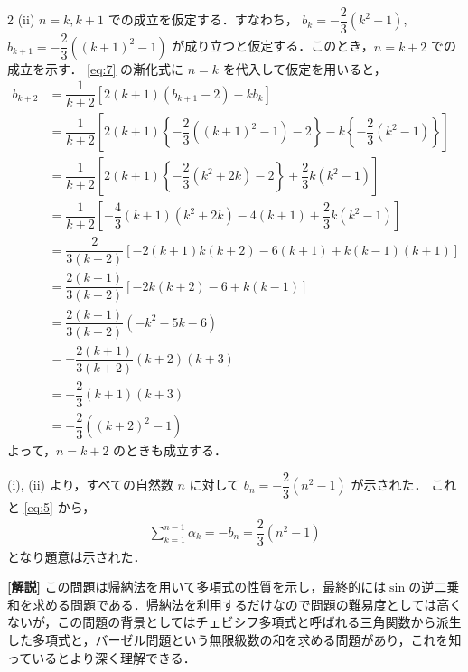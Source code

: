 \documentclass[../../main.tex]{subfiles}
\begin{document}
\begin{multicols}{2}
  (ii) $n=k, k+1$ での成立を仮定する．すなわち，
  $b_k = -\dfrac{2}{3}(k^2 - 1)$, $b_{k+1} = -\dfrac{2}{3}((k+1)^2 - 1)$
  が成り立つと仮定する．このとき，$n=k+2$ での成立を示す．
  \cref{eq:7} の漸化式に $n=k$ を代入して仮定を用いると，
  \begin{align}
    b_{k+2}
    & = \dfrac{1}{k+2} \left[ 2(k+1)(b_{k+1} - 2) - k b_k \right]                                                                      \\
    & = \dfrac{1}{k+2} \left[ 2(k+1) \left\{ -\dfrac{2}{3}((k+1)^2 - 1) - 2 \right\} - k \left\{ -\dfrac{2}{3}(k^2 - 1) \right\} \right] \\
    & = \dfrac{1}{k+2} \left[ 2(k+1) \left\{ -\dfrac{2}{3}(k^2+2k) - 2 \right\} + \dfrac{2}{3}k(k^2 - 1) \right]                         \\
    & = \dfrac{1}{k+2} \left[ -\dfrac{4}{3}(k+1)(k^2+2k) - 4(k+1) + \dfrac{2}{3}k(k^2-1) \right]                                         \\
    & = \dfrac{2}{3(k+2)} \left[ -2(k+1)k(k+2) - 6(k+1) + k(k-1)(k+1) \right]                                                          \\
    & = \dfrac{2(k+1)}{3(k+2)} \left[ -2k(k+2) - 6 + k(k-1) \right]                                                                    \\
    & = \dfrac{2(k+1)}{3(k+2)} (-k^2 - 5k - 6)                                                                                         \\
    & = -\dfrac{2(k+1)}{3(k+2)} (k+2)(k+3)                                                                                             \\
    & = -\dfrac{2}{3}(k+1)(k+3)                                                                                                        \\
    & = -\dfrac{2}{3}((k+2)^2 - 1)
  \end{align}
  よって，$n=k+2$ のときも成立する．

  (i), (ii) より，すべての自然数 $n$ に対して $b_n = -\dfrac{2}{3}(n^2 - 1)$ が示された．
  これと \cref{eq:5} から，
  \begin{align}
    \sum_{k=1}^{n-1} \alpha_k = -b_n = \dfrac{2}{3}(n^2-1)
  \end{align}
  となり題意は示された．

  {\bf [解説]}
  この問題は帰納法を用いて多項式の性質を示し，最終的には$\sin$の逆二乗和を求める問題である．帰納法を利用するだけなので問題の難易度としては高くないが，この問題の背景としてはチェビシフ多項式と呼ばれる三角関数から派生した多項式と，バーゼル問題という無限級数の和を求める問題があり，これを知っているとより深く理解できる．


\end{multicols}
\end{document}
